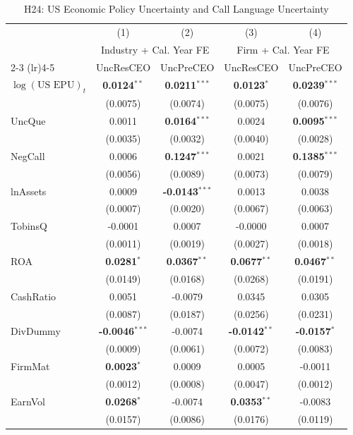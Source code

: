 \documentclass[11pt,a4paper]{article}
\begin{document}
\begin{table}[htbp]
\centering
\caption{H24: US Economic Policy Uncertainty and Call Language Uncertainty}
\label{tab:h24_us_epu}
\scriptsize
\begin{tabular}{lcccc}
\toprule
 & (1) & (2) & (3) & (4) \\
 & \multicolumn{2}{c}{Industry + Cal. Year FE} & \multicolumn{2}{c}{Firm + Cal. Year FE} \\
\cmidrule(lr){2-3} \cmidrule(lr){4-5}
 & UncResCEO & UncPreCEO & UncResCEO & UncPreCEO \\
\midrule
$\log(\text{US EPU})_{t}$ & \textbf{0.0124}$^{**}$ & \textbf{0.0211}$^{***}$ & \textbf{0.0123}$^{*}$ & \textbf{0.0239}$^{***}$ \\
 & (0.0075) & (0.0074) & (0.0075) & (0.0076) \\
\midrule
UncQue & 0.0011 & \textbf{0.0164}$^{***}$ & 0.0024 & \textbf{0.0095}$^{***}$ \\
 & (0.0035) & (0.0032) & (0.0040) & (0.0028) \\
NegCall & 0.0006 & \textbf{0.1247}$^{***}$ & 0.0021 & \textbf{0.1385}$^{***}$ \\
 & (0.0056) & (0.0089) & (0.0073) & (0.0079) \\
lnAssets & 0.0009 & \textbf{-0.0143}$^{***}$ & 0.0013 & 0.0038 \\
 & (0.0007) & (0.0020) & (0.0067) & (0.0063) \\
TobinsQ & -0.0001 & 0.0007 & -0.0000 & 0.0007 \\
 & (0.0011) & (0.0019) & (0.0027) & (0.0018) \\
ROA & \textbf{0.0281}$^{*}$ & \textbf{0.0367}$^{**}$ & \textbf{0.0677}$^{**}$ & \textbf{0.0467}$^{**}$ \\
 & (0.0149) & (0.0168) & (0.0268) & (0.0191) \\
CashRatio & 0.0051 & -0.0079 & 0.0345 & 0.0305 \\
 & (0.0087) & (0.0187) & (0.0256) & (0.0231) \\
DivDummy & \textbf{-0.0046}$^{***}$ & -0.0074 & \textbf{-0.0142}$^{**}$ & \textbf{-0.0157}$^{*}$ \\
 & (0.0009) & (0.0061) & (0.0072) & (0.0083) \\
FirmMat & \textbf{0.0023}$^{*}$ & 0.0009 & 0.0005 & -0.0011 \\
 & (0.0012) & (0.0008) & (0.0047) & (0.0012) \\
EarnVol & \textbf{0.0268}$^{*}$ & -0.0074 & \textbf{0.0353}$^{**}$ & -0.0083 \\
 & (0.0157) & (0.0086) & (0.0176) & (0.0119) \\

\end{tabular}
\end{table}
\end{document}
